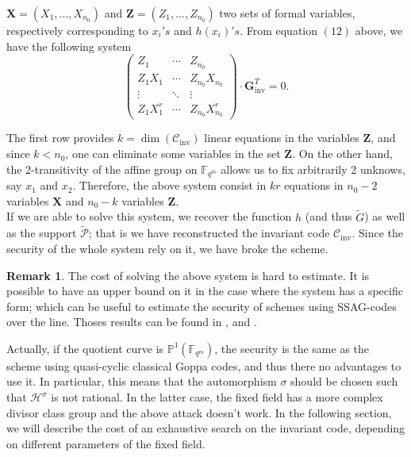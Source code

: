 \documentclass[10pt]{article}
\theoremstyle{definition}
\theoremstyle{definition}
\newtheorem{rq1}[thm]{Remark}
\theoremstyle{definition}
\newcommand{\s}{\vspace{0.3cm}}
\newcommand{\cd}{\cdot}
\newcommand{\PP}{\mathbb{P}}
\newcommand{\fqm}{\mathbb{F}_{q^m}}
\newcommand{\PR}{\mathcal{P}}
\begin{document}
$\mathbf{X} = (X_1,...,X_{n_0})$ and $\mathbf{Z} = (Z_1,...,Z_{n_0})$ two sets of formal variables, respectively corresponding to $x_i's$ and $h(x_i)'s$. From equation $(12)$ above, we have the following system
\begin{equation*}
\begin{pmatrix}
Z_1 & \cdots & Z_{n_0} \\
Z_1X_1 & \cdots & Z_{n_0}X_{n_0} \\
\vdots & \ddots & \vdots \\
Z_1X_1^r & \cdots & Z_{n_0}X_{n_0}^r 
\end{pmatrix}
\cd \mathbf{G}_{\mathrm{inv}}^T= 0.
\end{equation*}

The first row provides $k=\dim(\mathcal{C}_{\mathrm{inv}})$ linear equations in the variables $\mathbf{Z}$, and since $k < n_0$, one can eliminate some variables in the set $\mathbf{Z}$. On the other hand, the 2-transitivity of the affine group on $\fqm$ allows us to fix arbitrarily 2 unknows, say $x_1$ and $x_2$. Therefore, the above system consist in $kr$ equations in $n_0-2$ variables $\mathbf{X}$ and $n_0-k$ variables $\mathbf{Z}$. \\
If we are able to solve this system, we recover the function $h$ (and thus $\tilde{G}$) as well as the support $\tilde{\PR}$; that is we have reconstructed the invariant code $\mathcal{C}_{\mathrm{inv}}$. Since the security of the whole system rely on it, we have broke the scheme.  

\s

\begin{rq1} 
The cost of solving the above system is hard to estimate. It is possible to have an upper bound on it in the case where the system has a specific form; which can be useful to estimate the security of schemes using SSAG-codes over the line. Thoses results can be found in \cite{FOP}, \cite{FOP1} and \cite{FOP2}. 
\end{rq1}

Actually, if the quotient curve is $\PP^1(\fqm)$, the security is the same as the scheme using quasi-cyclic classical Goppa codes, and thus there no advantages to use it. In particular, this means that the automorphism $\sigma$ should be chosen such that $\mathcal{H}^{\sigma}$ is not rational. In the latter case, the fixed field has a more complex divisor class group and the above attack doesn't work. In the following section, we will describe the cost of an exhaustive search on the invariant code, depending on different parameters of the fixed field.
\end{document}
